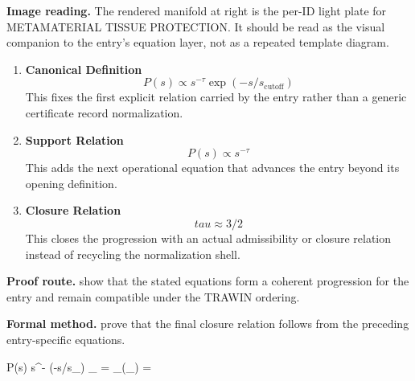\begin{samepage}
\noindent\begin{minipage}[t]{0.45\linewidth}
\vspace{0pt}
\raggedright
\scriptsize\textbf{Image reading.} The rendered manifold at right is the per-ID light plate for METAMATERIAL TISSUE PROTECTION. It should be read as the visual companion to the entry's equation layer, not as a repeated template diagram.\par
\end{minipage}\hfill
\begin{minipage}[t]{0.53\linewidth}
\vspace*{-0.10in}
\raggedright
{}
\end{minipage}
\end{samepage}

\clearpage


\begin{enumerate}[leftmargin=1.6em,itemsep=9pt,topsep=6pt]
\item \textbf{Canonical Definition}
\[
P(s) \propto s^{-\tau} \exp(-s/s_{\text{cutoff}})
\]
This fixes the first explicit relation carried by the entry rather than a generic certificate record normalization.

\item \textbf{Support Relation}
\[
P(s) \propto s^{-\tau}
\]
This adds the next operational equation that advances the entry beyond its opening definition.

\item \textbf{Closure Relation}
\[
tau \approx 3/2
\]
This closes the progression with an actual admissibility or closure relation instead of recycling the normalization shell.
\end{enumerate}

\textbf{Proof route.} show that the stated equations form a coherent progression for the entry and remain compatible under the TRAWIN ordering.

\textbf{Formal method.} prove that the final closure relation follows from the preceding entry-specific equations.

\medskip
{}

\begin{tzpsnapshot}
\end{tzpsnapshot}

\tzpequationlinks
  {P(s) \propto s^{-\tau} \exp(-s/s_{})}
  {_{} = \cdots}
  {_{}\!\left(_{}\right) = \cdots}
